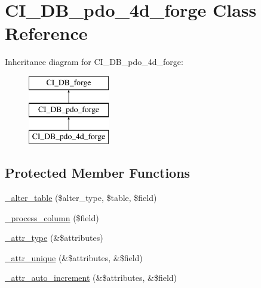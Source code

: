 \hypertarget{class_c_i___d_b__pdo__4d__forge}{}\section{C\+I\+\_\+\+D\+B\+\_\+pdo\+\_\+4d\+\_\+forge Class Reference}
\label{class_c_i___d_b__pdo__4d__forge}
Inheritance diagram for C\+I\+\_\+\+D\+B\+\_\+pdo\+\_\+4d\+\_\+forge\+:\begin{figure}[H]
\begin{center}
\leavevmode
\includegraphics[height=3.000000cm]{class_c_i___d_b__pdo__4d__forge}
\end{center}
\end{figure}
\subsection*{Protected Member Functions}
\begin{DoxyCompactItemize}
\item 
\mbox{\hyperlink{class_c_i___d_b__pdo__4d__forge_ad22823508d8d530c384ed9e5dc3dfddd}{\+\_\+alter\+\_\+table}} (\$alter\+\_\+type, \$table, \$field)
\item 
\mbox{\hyperlink{class_c_i___d_b__pdo__4d__forge_ae13bfcc213959e51ff7e80c2511fb230}{\+\_\+process\+\_\+column}} (\$field)
\item 
\mbox{\hyperlink{class_c_i___d_b__pdo__4d__forge_acc5f352055957b5f286e8daddb9333c9}{\+\_\+attr\+\_\+type}} (\&\$attributes)
\item 
\mbox{\hyperlink{class_c_i___d_b__pdo__4d__forge_af6e1d102293a1838a0528006b22f871f}{\+\_\+attr\+\_\+unique}} (\&\$attributes, \&\$field)
\item 
\mbox{\hyperlink{class_c_i___d_b__pdo__4d__forge_a897f9674088f9567c3bec036ae419a83}{\+\_\+attr\+\_\+auto\+\_\+increment}} (\&\$attributes, \&\$field)
\end{DoxyCompactItemize}
